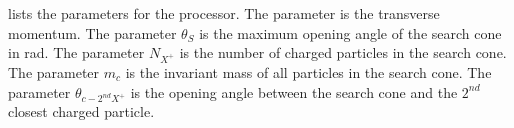  lists the parameters  for the  \BonoTauFinder processor. The parameter \pT is the transverse momentum. The parameter $\theta_S$ is the maximum opening angle of the search cone in rad. The parameter $ N_{X^+}$ is the number of charged particles in the search cone. The parameter $m_{c}$ is the invariant mass of all particles in the search cone. The parameter $\theta_{c-2^{nd}X^+}$ is the opening angle between the search cone  and the $2^{nd}$ closest charged particle.












